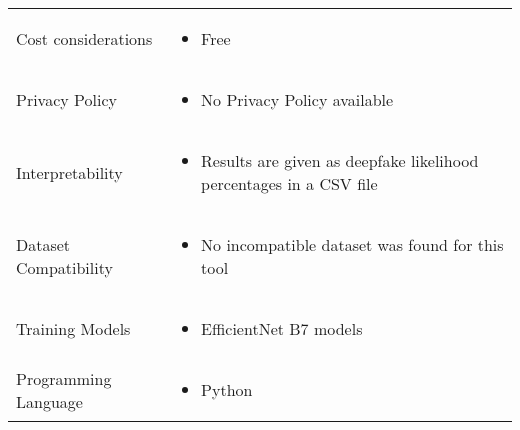 \begin{table}[htpb]
\begin{tabularx}{\textwidth}{l X}
		Cost considerations          & \begin{itemize}[nosep,nolistsep,noitemsep]
			                               \item Free
		                               \end{itemize}                                          \\
		Privacy Policy               & \begin{itemize}[nosep,nolistsep,noitemsep]
			                               \item No Privacy Policy available
		                               \end{itemize}                                          \\
		Interpretability             & \begin{itemize}[nosep,nolistsep,noitemsep]
			                               \item Results are given as deepfake likelihood percentages in a \ac{CSV} file
		                               \end{itemize}       \\
		Dataset Compatibility        & \begin{itemize}[nosep,nolistsep,noitemsep]
			                               \item No incompatible dataset was found for this tool
		                               \end{itemize}                               \\
		Training Models              & \begin{itemize}[nosep,nolistsep,noitemsep]
			                               \item EfficientNet B7 models
		                               \end{itemize}                                          \\
		Programming Language         & \begin{itemize}[nosep,nolistsep,noitemsep]
			                               \item Python
		                               \end{itemize}                                          \\
		\bottomrule
	\end{tabularx}
\end{table}

